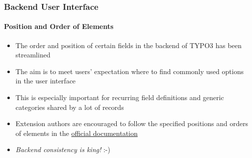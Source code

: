 \begin{frame}[fragile]
	\frametitle{Backend User Interface}
	\framesubtitle{Position and Order of Elements}

	\begin{itemize}
		\item The order and position of certain fields in the backend of TYPO3 has been streamlined
		\item The aim is to meet users' expectation where to find commonly used options in the user interface
		\item This is especially important for recurring field definitions and generic categories shared by a lot of records
		\item Extension authors are encouraged to follow the specified positions and orders of elements in
			the \href{https://docs.typo3.org}{official documentation}


	\end{itemize}

	\begin{itemize}
		\item \textit{Backend consistency is king!} :-)
	\end{itemize}

\end{frame}

